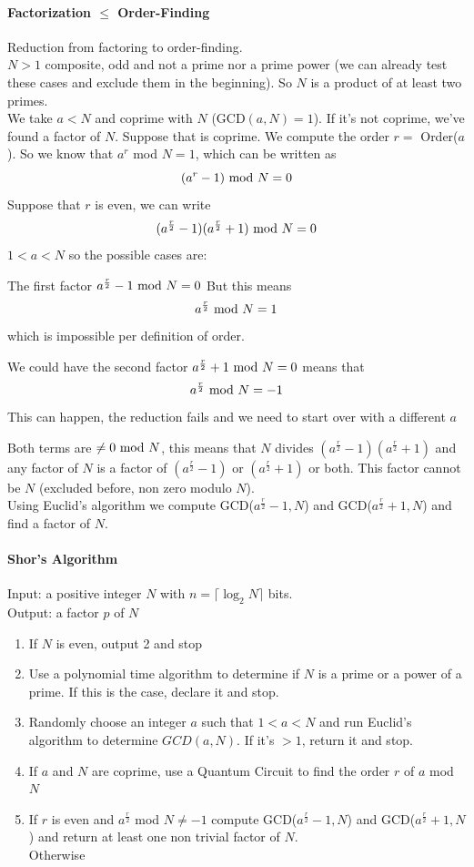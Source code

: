 \documentclass[10pt]{report}
\begin{document}
\paragraph{Factorization $\leq$ Order-Finding} Reduction from factoring to order-finding.\\
$N>1$ composite, odd and not a prime nor a prime power (we can already test these cases and exclude them in the beginning). So $N$ is a product of at least two primes.\\
We take $a< N$ and coprime with $N$ (GCD$(a,N)=1$). If it's not coprime, we've found a factor of $N$. Suppose that is coprime. We compute the order $r=$ Order($a$). So we know that $a^r$ mod $N=1$, which can be written as $$(a^r-1)\hbox{ mod }N = 0$$
Suppose that $r$ is even, we can write
$$(a^{\frac{r}{2}}-1)(a^{\frac{r}{2}}+1)\hbox{ mod }N = 0$$
$1<a<N$ so the possible cases are:\begin{list}{}{}
	\item The first factor $a^{\frac{r}{2}}-1\hbox{ mod }N = 0$
	But this means $$a^{\frac{r}{2}}\hbox{ mod }N = 1$$ which is impossible per definition of order.
	\item We could have the second factor $a^{\frac{r}{2}}+1\hbox{ mod }N = 0$ means that 
	$$a^{\frac{r}{2}}\hbox{ mod }N = -1$$
	This can happen, the reduction fails and we need to start over with a different $a$
	\item Both terms are $\neq0\hbox{ mod }N$, this means that $N$ divides $(a^{\frac{r}{2}}-1)(a^{\frac{r}{2}}+1)$ and any factor of $N$ is a factor of $(a^{\frac{r}{2}}-1)$ or $(a^{\frac{r}{2}}+1)$ or both. This factor cannot be $N$ (excluded before, non zero modulo $N$).\\
	Using Euclid's algorithm we compute GCD($a^{\frac{r}{2}}-1,N$) and GCD($a^{\frac{r}{2}}+1,N$) and find a factor of $N$.
\end{list}
\paragraph{Shor's Algorithm} 
Input: a positive integer $N$ with $n=\lceil\log_2 N\rceil$ bits.\\
Output: a factor $p$ of $N$
\begin{enumerate}
	\item If $N$ is even, output 2 and stop
	\item Use a polynomial time algorithm to determine if $N$ is a prime or a power of a prime. If this is the case, declare it and stop.
	\item Randomly choose an integer $a$ such that $1<a<N$ and run Euclid's algorithm to determine $GCD(a,N)$. If it's $>1$, return it and stop.
	\item If $a$ and $N$ are coprime, use a Quantum Circuit to find the order $r$ of $a$ mod $N$
	\item If $r$ is even and $a^{\frac{r}{2}}$ mod $N\neq -1$ compute GCD($a^{\frac{r}{2}}-1,N$) and GCD($a^{\frac{r}{2}}+1,N$) and return at least one non trivial factor of $N$.\\
	Otherwise
\end{enumerate}
\end{document}
